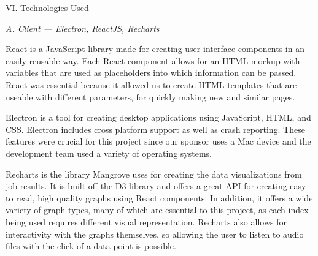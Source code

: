 \begin{center}
VI. Technologies Used
\end{center}
\begin{flushleft}
\setlength{\parindent}{0.125in}
\noindent\textit{A. Client --- Electron, ReactJS, Recharts}\par
React is a JavaScript library made for creating user interface components in an easily reusable way. Each React component allows for an HTML mockup with variables that are used as placeholders into which information can be passed. React was essential because it allowed us to create HTML templates that are useable with different parameters, for quickly making new and similar pages.\par
Electron is a tool for creating desktop applications using JavaScript, HTML, and CSS. Electron includes cross platform support as well as crash reporting. These features were crucial for this project since our sponsor uses a Mac device and the development team used a variety of operating systems.\par
Recharts is the library Mangrove uses for creating the data visualizations from job results. It is built off the D3 library and offers a great API for creating easy to read, high quality graphs using React components. In addition, it offers a wide variety of graph types, many of which are essential to this project, as each index being used requires different visual representation. Recharts also allows for interactivity with the graphs themselves, so allowing the user to listen to audio files with the click of a data point is possible.\\[4pt]


\end{flushleft}
